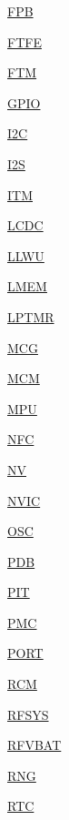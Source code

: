 \begin{DoxyCompactItemize}
\item 
\hyperlink{group___f_p_b___peripheral}{F\+P\+B}
\item 
\hyperlink{group___f_t_f_e___peripheral}{F\+T\+F\+E}
\item 
\hyperlink{group___f_t_m___peripheral}{F\+T\+M}
\item 
\hyperlink{group___g_p_i_o___peripheral}{G\+P\+I\+O}
\item 
\hyperlink{group___i2_c___peripheral}{I2\+C}
\item 
\hyperlink{group___i2_s___peripheral}{I2\+S}
\item 
\hyperlink{group___i_t_m___peripheral}{I\+T\+M}
\item 
\hyperlink{group___l_c_d_c___peripheral}{L\+C\+D\+C}
\item 
\hyperlink{group___l_l_w_u___peripheral}{L\+L\+W\+U}
\item 
\hyperlink{group___l_m_e_m___peripheral}{L\+M\+E\+M}
\item 
\hyperlink{group___l_p_t_m_r___peripheral}{L\+P\+T\+M\+R}
\item 
\hyperlink{group___m_c_g___peripheral}{M\+C\+G}
\item 
\hyperlink{group___m_c_m___peripheral}{M\+C\+M}
\item 
\hyperlink{group___m_p_u___peripheral}{M\+P\+U}
\item 
\hyperlink{group___n_f_c___peripheral}{N\+F\+C}
\item 
\hyperlink{group___n_v___peripheral}{N\+V}
\item 
\hyperlink{group___n_v_i_c___peripheral}{N\+V\+I\+C}
\item 
\hyperlink{group___o_s_c___peripheral}{O\+S\+C}
\item 
\hyperlink{group___p_d_b___peripheral}{P\+D\+B}
\item 
\hyperlink{group___p_i_t___peripheral}{P\+I\+T}
\item 
\hyperlink{group___p_m_c___peripheral}{P\+M\+C}
\item 
\hyperlink{group___p_o_r_t___peripheral}{P\+O\+R\+T}
\item 
\hyperlink{group___r_c_m___peripheral}{R\+C\+M}
\item 
\hyperlink{group___r_f_s_y_s___peripheral}{R\+F\+S\+Y\+S}
\item 
\hyperlink{group___r_f_v_b_a_t___peripheral}{R\+F\+V\+B\+A\+T}
\item 
\hyperlink{group___r_n_g___peripheral}{R\+N\+G}
\item 
\hyperlink{group___r_t_c___peripheral}{R\+T\+C}

\end{DoxyCompactItemize}
